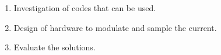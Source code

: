 \documentclass{beamer}
\begin{document}
\begin{frame}
		\begin{enumerate}

				\item Investigation of codes that can be used.

				\item Design of hardware to modulate and sample the current.

				\item Evaluate the solutions.

		\end{enumerate}

		

		




	\end{frame}





\end{document}
